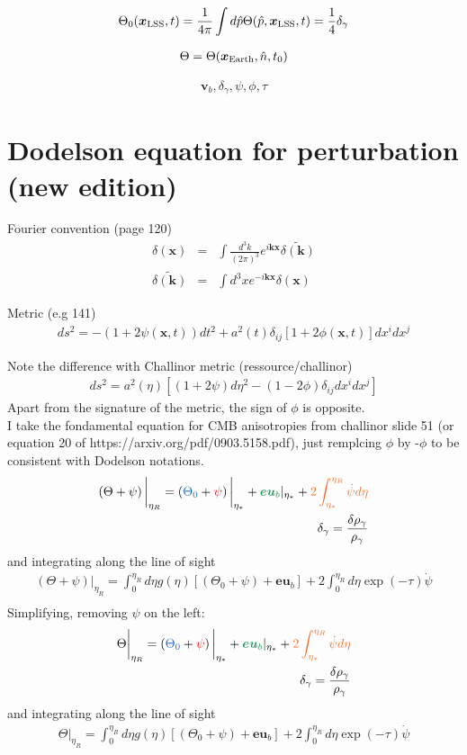 \documentclass[a4paper, 11pt]{article}
\def\ba{\begin{eqnarray}}
\def\ea{\end{eqnarray}}
\newcommand{\red}[1]{{\color{red}#1}}
\newcommand{\green}[1]{{\color{ForestGreen}#1}}
\newcommand{\cyan}[1]{{\color{Orange}#1}}
\newcommand{\blue}[1]{{\color{denim}#1}}
\begin{document}
 


\ba
\Theta_{0}(\bm{x}_{\rm LSS},t) = \frac{1}{4\pi} \int d\hat{p} \Theta (\hat{p}, \bm{x}_{\rm LSS},t) = \frac{1}{4} \delta_{\gamma}
\ea

\ba
\Theta = \Theta(\bm{x}_{\rm Earth}, \hat{n}, t_{0})
\ea

 \ba
{\bm v_{b}}, \delta_{\gamma}, \psi, \phi, \tau
\ea

\section{Dodelson equation for perturbation (new edition)}

Fourier convention (page 120)
\ba
\delta(\bm{x}) &=& \int \frac{d^{3}k}{(2\pi)^{3}} e^{i\bm{k}\bm{x}} \tilde{\delta(\bm{k})} \\
\tilde{\delta(\bm{k})} &=& \int d^{3}x e^{-i\bm{k}\bm{x}} \delta(\bm{x})
\ea

Metric (e.g 141)
\ba
ds^{2} = -(1 + 2\psi(\bm{x},t))dt^{2} + a^{2}(t)\delta_{ij}[1+2\phi(\bm{x},t)]dx^{i}dx^{j}
\ea

Note the difference with Challinor metric (ressource/challinor)
\ba
ds^{2} =  a^{2}(\eta) [ (1 + 2\psi)d\eta^{2} - ( 1- 2\phi)\delta_{ij}dx^{i}dx^{j} ] 
\ea
Apart from the signature of the metric, the sign of $\phi$ is opposite. \\
I take the fondamental equation for CMB anisotropies from challinor slide 51 (or equation 20 of https://arxiv.org/pdf/0903.5158.pdf), just remplcing $\phi$ by -$\phi$ to be consistent
with Dodelson notations.
  \ba
 \left(\Theta+ \psi \right) \bigg|_{\eta_{R}} = \left(\blue{\Theta_{0}} + \red{\psi} \right)\bigg|_{\eta_{*}} + \green{\bm{e}{\bm u_{b}}} |_{\eta_{*}} +  \cyan{2 \int_{\eta_{*}}^{\eta_{R}} \dot{\psi}  d\eta} \\
\delta_{\gamma} = \frac{ \delta \rho_{\gamma}}{\rho_{\gamma}} 
\ea
and integrating along the line of sight
\ba
 \left(\Theta+ \psi \right) \bigg|_{\eta_{R}} = \int_{0}^{\eta_{R}} d\eta g(\eta) \left[\left(\Theta_{0}+ \psi \right)  + \bm{e}{\bm u_{b}}  \right] + 2 \int_{0}^{\eta_{R}} d\eta \exp(-\tau)  \dot{\psi}   \\
\ea
Simplifying, removing $\psi$ on the left:
  \ba
\Theta  \bigg|_{\eta_{R}} = \left(\blue{\Theta_{0}} + \red{\psi} \right)\bigg|_{\eta_{*}} + \green{\bm{e}{\bm u_{b}}} |_{\eta_{*}} +  \cyan{2 \int_{\eta_{*}}^{\eta_{R}} \dot{\psi}  d\eta} \\
\delta_{\gamma} = \frac{ \delta \rho_{\gamma}}{\rho_{\gamma}} 
\ea
and integrating along the line of sight
\ba
 \Theta \bigg|_{\eta_{R}} = \int_{0}^{\eta_{R}} d\eta g(\eta) \left[\left(\Theta_{0}+ \psi \right)  + \bm{e}{\bm u_{b}}  \right] + 2 \int_{0}^{\eta_{R}} d\eta \exp(-\tau)  \dot{\psi}   \\
\ea
\end{document}
